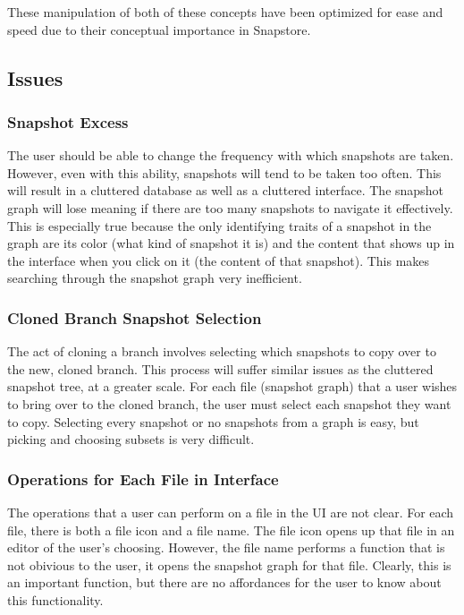 These manipulation of both of these concepts have been optimized for ease and speed due to their conceptual importance in Snapstore.

\subsection{Issues}

\subsubsection{Snapshot Excess}

The user should be able to change the frequency with which snapshots are taken. However, even with this ability, snapshots will tend to be taken too often. This will result in a cluttered database as well as a cluttered interface. The snapshot graph will lose meaning if there are too many snapshots to navigate it effectively. This is especially true because the only identifying traits of a snapshot in the graph are its color (what kind of snapshot it is) and the content that shows up in the interface when you click on it (the content of that snapshot). This makes searching through the snapshot graph very inefficient.

\subsubsection{Cloned Branch Snapshot Selection}

The act of cloning a branch involves selecting which snapshots to copy over to the new, cloned branch. This process will suffer similar issues as the cluttered snapshot tree, at a greater scale. For each file (snapshot graph) that a user wishes to bring over to the cloned branch, the user must select each snapshot they want to copy. Selecting every snapshot or no snapshots from a graph is easy, but picking and choosing subsets is very difficult.

\subsubsection{Operations for Each File in Interface}

The operations that a user can perform on a file in the UI are not clear. For each file, there is both a file icon and a file name. The file icon opens up that file in an editor of the user's choosing. However, the file name performs a function that is not obivious to the user, it opens the snapshot graph for that file. Clearly, this is an important function, but there are no affordances for the user to know about this functionality.

